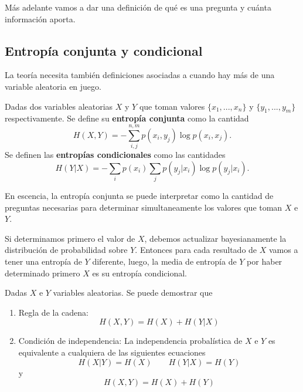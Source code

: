 M\'as adelante vamos a dar una definici\'on de qu\'e es una pregunta y cu\'anta informaci\'on aporta.

\subsection{Entrop\'ia conjunta y condicional}
La teor\'ia necesita tambi\'en definiciones asociadas a cuando hay m\'as de una variable aleatoria en juego.
\begin{definition}
    Dadas dos variables aleatorias $X$ y $Y$ que toman valores $\{x_1,...,x_n\}$ y $\{y_1,...,y_m\}$ respectivamente. Se define su {\bf entrop\'ia conjunta} como la cantidad
    \begin{equation}
        H(X,Y) = -\sum_{i,j}^{n,m}p(x_i,y_j)\log p(x_i,x_j).
    \end{equation}
    Se definen las {\bf entrop\'ias condicionales} como las cantidades
    \begin{equation}
        H(Y|X) = -\sum_ip(x_i)\sum_jp(y_j|x_i)\log p(y_j|x_i).
    \end{equation}
\end{definition}
En escencia, la entrop\'ia conjunta se puede interpretar como la cantidad de preguntas necesarias para determinar simultaneamente los valores que toman $X$ e $Y$.

Si determinamos primero el valor de $X$, debemos actualizar bayesianamente la distribuci\'on de probabilidad sobre $Y$. Entonces para cada resultado de $X$ vamos a tener una entrop\'ia de $Y$ diferente, luego, la media de entrop\'ia de $Y$ por haber determinado primero $X$ es su entrop\'ia condicional.

\begin{theorem}
    Dadas $X$ e $Y$ variables aleatorias. Se puede demostrar que 
    \begin{enumerate}
        \item Regla de la cadena:
        \begin{equation}
            H(X,Y) = H(X) + H(Y|X)
        \end{equation}
        \item Condici\'on de independencia: La independencia probal\'istica de $X$ e $Y$ es equivalente a cualquiera de las siguientes ecuaciones
        \begin{equation}
            H(X|Y) = H(X)\qquad H(Y|X) = H(Y)
        \end{equation}
        y
        \begin{equation}
            H(X,Y) = H(X)+H(Y)
        \end{equation}
    \end{enumerate}
\end{theorem}

